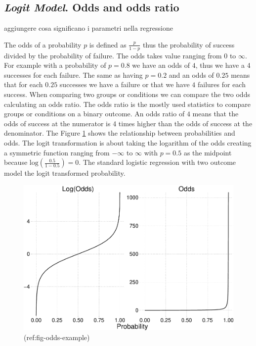 \documentclass[
  man,floatsintext]{apa6}
\begin{document}
\subsection{\texorpdfstring{\emph{Logit Model}. Odds and odds ratio}{Logit Model. Odds and odds ratio}}\label{logit-model.-odds-and-odds-ratio}

aggiungere cosa significano i parametri nella regressione

The odds of a probability \(p\) is defined as \(\frac{p}{1 - p}\) thus the probability of success divided by the probability of failure. The odds takes value ranging from 0 to \(\infty\). For example with a probability of \(p = 0.8\) we have an odds of \(4\), thus we have a 4 successes for each failure. The same as having \(p = 0.2\) and an odds of \(0.25\) means that for each \(0.25\) successes we have a failure or that we have \(4\) failures for each success. When comparing two groups or conditions we can compare the two odds calculating an odds ratio. The odds ratio is the mostly used statistics to compare groups or conditions on a binary outcome. An odds ratio of \(4\) means that the odds of success at the numerator is 4 times higher than the odds of success at the denominator. The Figure \ref{fig:fig-odds-example} shows the relationship between probabilities and odds. The logit transformation is about taking the logarithm of the odds creating a symmetric function ranging from \(-\infty\) to \(\infty\) with \(p = 0.5\) as the midpoint because \(\text{log}(\frac{0.5}{1 - 0.5}) = 0\). The standard logistic regression with two outcome model the logit transformed probability.

\scriptsize

\begin{figure}

{\centering \includegraphics{paper-new_files/figure-latex/fig-odds-example-1} 

}

\caption{(ref:fig-odds-example)}\label{fig:fig-odds-example}
\end{figure}
\end{document}
